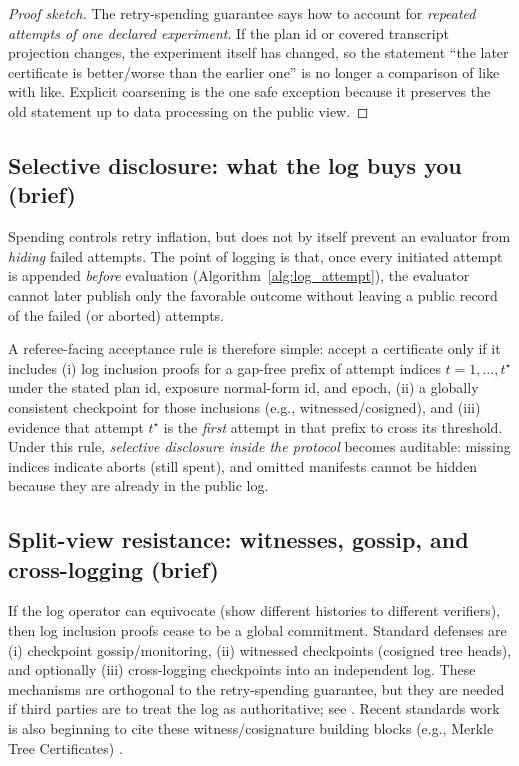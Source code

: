 \documentclass[11pt]{article}
\begin{document}
\begin{proof}[Proof sketch]
The retry-spending guarantee says how to account for \emph{repeated attempts of one declared experiment}.
If the plan id or covered transcript projection changes, the experiment itself has changed, so the statement ``the later certificate is better/worse than the earlier one'' is no longer a comparison of like with like.
Explicit coarsening is the one safe exception because it preserves the old statement up to data processing on the public view.
\end{proof}


\subsection{Selective disclosure: what the log buys you (brief)}
Spending controls retry inflation, but does not by itself prevent an evaluator from \emph{hiding} failed attempts.
The point of logging is that, once every initiated attempt is appended \emph{before} evaluation (Algorithm~\ref{alg:log_attempt}),
the evaluator cannot later publish only the favorable outcome without leaving a public record of the failed (or aborted) attempts.

A referee-facing acceptance rule is therefore simple:
accept a certificate only if it includes (i) log inclusion proofs for a gap-free prefix of attempt indices $t=1,\dots,t^\star$ under the stated plan id, exposure normal-form id, and epoch,
(ii) a globally consistent checkpoint for those inclusions (e.g., witnessed/cosigned), and
(iii) evidence that attempt $t^\star$ is the \emph{first} attempt in that prefix to cross its threshold.
Under this rule, \emph{selective disclosure inside the protocol} becomes auditable: missing indices indicate aborts (still spent), and omitted manifests cannot be hidden because they are already in the public log.

\subsection{Split-view resistance: witnesses, gossip, and cross-logging (brief)}
If the log operator can equivocate (show different histories to different verifiers), then log inclusion proofs cease to be a global commitment.
Standard defenses are (i) checkpoint gossip/monitoring, (ii) witnessed checkpoints (cosigned tree heads), and optionally (iii) cross-logging checkpoints into an independent log.
These mechanisms are orthogonal to the retry-spending guarantee, but they are needed if third parties are to treat the log as authoritative; see \cite{dahlberg2018ctgossip,syta2016cosi,dirksen2021logpicker,hicks2023sok_transparency}. Recent standards work is also beginning to cite these witness/cosignature building blocks (e.g., Merkle Tree Certificates) \cite{ietf_plants_merkle_tree_certs}.
\end{document}
